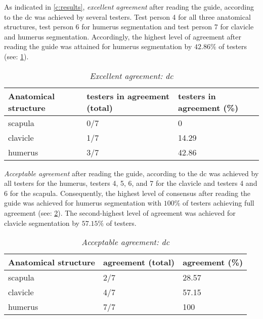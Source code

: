 \noindent
As indicated in \cref{c:results}, \textit{excellent agreement} after reading the guide,
according to the \acrlong{dc} was achieved by several testers.
Test person 4 for all three anatomical structures,
test person 6 for humerus segmentation
and test person 7 for clavicle and humerus segmentation.
Accordingly, the highest level of agreement after reading the guide was attained for humerus segmentation
by $42.86\%$ of testers (see: \cref{tab:dc-excellent}).
\begin{table}[ht]
	\begin{center}
		\begin{tabular}{l l l}
			\textbf{Anatomical structure} & testers in agreement (total) & testers in  agreement (\%) \\
			\hline
			scapula                       & 0/7                          & 0                          \\
			clavicle                      & 1/7                          & 14.29                      \\
			humerus                       & 3/7                          & 42.86                      \\
		\end{tabular}
		\caption{\textit{Excellent agreement: \acrshort{dc}}}\label{tab:dc-excellent}
	\end{center}
\end{table}

\noindent
\textit{Acceptable agreement} after reading the guide, according to the \acrshort{dc} was achieved by all testers for the humerus,
testers 4, 5, 6, and 7 for the clavicle
and testers 4 and 6 for the scapula.
Consequently, the highest level of consensus after reading the guide was achieved for humerus segmentation with $100\%$
of testers achieving full agreement (see: \cref{tab:dc-acceptable}).
The second-highest level of agreement was achieved for clavicle segmentation by $57.15\%$ of testers.
\begin{table}[ht]
	\begin{center}
		\begin{tabular}{l l l}
			\textbf{Anatomical structure} & agreement (total) & agreement (\%) \\
			\hline
			scapula                       & 2/7               & 28.57          \\
			clavicle                      & 4/7               & 57.15          \\
			humerus                       & 7/7               & 100            \\
		\end{tabular}
		\caption{\textit{Acceptable agreement: \acrshort{dc}}}\label{tab:dc-acceptable}
	\end{center}
\end{table}

